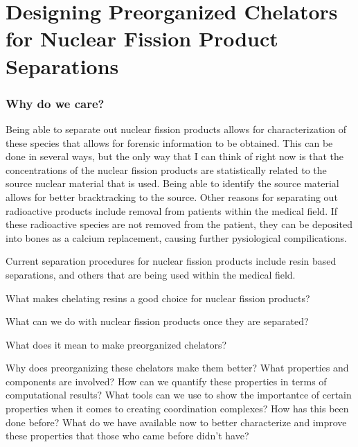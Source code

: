 \section{Designing Preorganized Chelators for Nuclear Fission Product Separations}

\begin{frame}
\sectionpage
\end{frame}

\begin{frame}
\frametitle{Why do we care?}
Being able to separate out nuclear fission products allows for characterization of these species that allows for forensic information to be obtained. This can be done in several ways, but the only way that I can think of right now is
that the concentrations of the nuclear fission products are statistically related to the source nuclear material that is used. Being able to identify the source material allows for better bracktracking to the source. Other reasons for
separating out radioactive products include removal from patients within the medical field. If these radioactive species are not removed from the patient, they can be deposited into bones as a calcium replacement, causing further
pysiological compilications. 
\end{frame}

\begin{frame}
Current separation procedures for nuclear fission products include resin based separations, and others that are being used within the medical field. 
\end{frame}

\begin{frame}
What makes chelating resins a good choice for nuclear fission products?
\end{frame}

\begin{frame}
What can we do with nuclear fission products once they are separated?
\end{frame}

\begin{frame}
What does it mean to make preorganized chelators?
\end{frame}

\begin{frame}
Why does preorganizing these chelators make them better? What properties and components are involved?
How can we quantify these properties in terms of computational results?
What tools can we use to show the importantce of certain properties when it comes to creating coordination complexes?
How has this been done before?
What do we have available now to better characterize and improve these properties that those who came before didn't have?
\end{frame}

